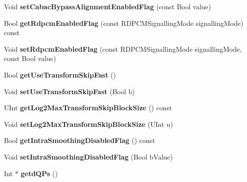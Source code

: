 \begin{DoxyCompactItemize}
\mbox{\label{class_t_enc_cfg_ab30a17801f18f64d61c6aaf0e7cf534e}} 
Void {\bfseries set\+Cabac\+Bypass\+Alignment\+Enabled\+Flag} (const Bool value)
\item 
\mbox{\label{class_t_enc_cfg_a65edfc4d017de20066a756b83c638275}} 
Bool {\bfseries get\+Rdpcm\+Enabled\+Flag} (const R\+D\+P\+C\+M\+Signalling\+Mode signalling\+Mode) const
\item 
\mbox{\label{class_t_enc_cfg_a802896b217ab384811be14055606605f}} 
Void {\bfseries set\+Rdpcm\+Enabled\+Flag} (const R\+D\+P\+C\+M\+Signalling\+Mode signalling\+Mode, const Bool value)
\item 
\mbox{\label{class_t_enc_cfg_a0e820ac102dab44e88351f20a6600f39}} 
Bool {\bfseries get\+Use\+Transform\+Skip\+Fast} ()
\item 
\mbox{\label{class_t_enc_cfg_a680a4c8edd681d0ec68c2e400ed05831}} 
Void {\bfseries set\+Use\+Transform\+Skip\+Fast} (Bool b)
\item 
\mbox{\label{class_t_enc_cfg_ad1b43d69125f9034049aa66ac53b2aa3}} 
U\+Int {\bfseries get\+Log2\+Max\+Transform\+Skip\+Block\+Size} () const
\item 
\mbox{\label{class_t_enc_cfg_ae1b0d03b3ccb6a0719da77ca456be36f}} 
Void {\bfseries set\+Log2\+Max\+Transform\+Skip\+Block\+Size} (U\+Int u)
\item 
\mbox{\label{class_t_enc_cfg_a0c3046ea704ee4272db059844903c507}} 
Bool {\bfseries get\+Intra\+Smoothing\+Disabled\+Flag} () const
\item 
\mbox{\label{class_t_enc_cfg_adb67e15817da34a9ce753872ecbea00b}} 
Void {\bfseries set\+Intra\+Smoothing\+Disabled\+Flag} (Bool b\+Value)
\item 
\mbox{\label{class_t_enc_cfg_aa430113fde8cbb51db77d9ef3210334a}} 
Int $\ast$ {\bfseries getd\+Q\+Ps} ()
\item 
\mbox{\label{class_t_enc_cfg_a42cd4db68fcb2564d26549bd1232ff97}} 

\end{DoxyCompactItemize}
